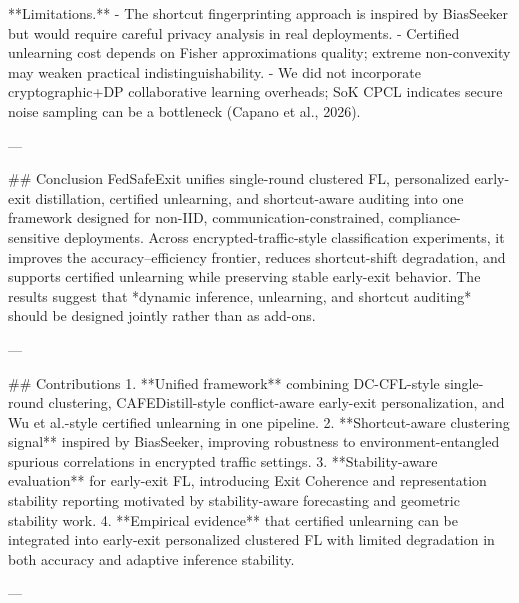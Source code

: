 **Limitations.**  
- The shortcut fingerprinting approach is inspired by BiasSeeker but would require careful privacy analysis in real deployments.  
- Certified unlearning cost depends on Fisher approximations quality; extreme non-convexity may weaken practical indistinguishability.  
- We did not incorporate cryptographic+DP collaborative learning overheads; SoK CPCL indicates secure noise sampling can be a bottleneck (Capano et al., 2026).

---

## Conclusion  
FedSafeExit unifies single-round clustered FL, personalized early-exit distillation, certified unlearning, and shortcut-aware auditing into one framework designed for non-IID, communication-constrained, compliance-sensitive deployments. Across encrypted-traffic-style classification experiments, it improves the accuracy–efficiency frontier, reduces shortcut-shift degradation, and supports certified unlearning while preserving stable early-exit behavior. The results suggest that *dynamic inference, unlearning, and shortcut auditing* should be designed jointly rather than as add-ons.

---

## Contributions  
1. **Unified framework** combining DC-CFL-style single-round clustering, CAFEDistill-style conflict-aware early-exit personalization, and Wu et al.-style certified unlearning in one pipeline.  
2. **Shortcut-aware clustering signal** inspired by BiasSeeker, improving robustness to environment-entangled spurious correlations in encrypted traffic settings.  
3. **Stability-aware evaluation** for early-exit FL, introducing Exit Coherence and representation stability reporting motivated by stability-aware forecasting and geometric stability work.  
4. **Empirical evidence** that certified unlearning can be integrated into early-exit personalized clustered FL with limited degradation in both accuracy and adaptive inference stability.

---